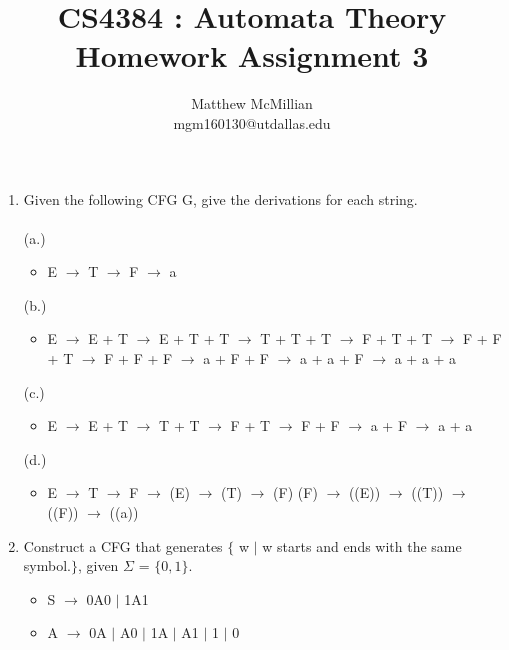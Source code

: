 \documentclass[12pt]{article}
\begin{document}
\title{CS4384 : Automata Theory\\Homework Assignment 3}
\author{Matthew McMillian\\mgm160130@utdallas.edu}
\maketitle


\begin{enumerate}
	\item Given the following CFG G, give the derivations for each string.\\ \\
	
	(a.) \begin{itemize}
		\item[] E $\rightarrow$ T $\rightarrow$ F $\rightarrow$ a
	\end{itemize}
	
	(b.) \begin{itemize}
		\item[] E $\rightarrow$ E + T $\rightarrow$ E + T + T $\rightarrow$ T + T + T  $\rightarrow$ F + T + T $\rightarrow$ F + F + T $\rightarrow$ F + F + F $\rightarrow$ a + F + F  $\rightarrow$ a + a + F $\rightarrow$ a + a + a
	\end{itemize}
	
	(c.)\begin{itemize}
		\item[] E $\rightarrow$ E + T $\rightarrow$ T + T $\rightarrow$ F + T $\rightarrow$ F + F $\rightarrow$ a + F $\rightarrow$ a + a
	\end{itemize}
	
	(d.) \begin{itemize}
		\item[] E $\rightarrow$ T $\rightarrow$ F $\rightarrow$ (E) $\rightarrow$ (T) $\rightarrow$ (F) (F) $\rightarrow$ ((E)) $\rightarrow$ ((T)) $\rightarrow$ ((F))  $\rightarrow$ ((a))
	\end{itemize}
	
	\item Construct a CFG that generates $\{$ w $|$ w starts and ends with the same symbol.$\}$, given $\Sigma$ = $\{0,1\}$. 
	\begin{itemize}
		\item[] S $\rightarrow$ 0A0 $|$ 1A1
		\item[] A $\rightarrow$ 0A $|$ A0 $|$ 1A $|$ A1 $|$ 1 $|$ 0 \\
	\end{itemize}
	

\end{enumerate}
\end{document}
